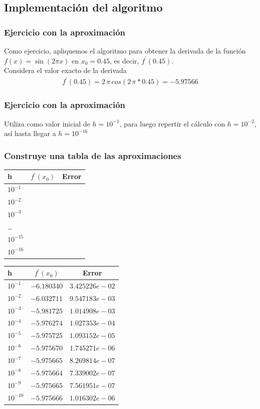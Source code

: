 \subsection{Implementación del algoritmo}
\begin{frame}
\frametitle{Ejercicio con la aproximación}
Como ejercicio, apliquemos el algoritmo para obtener la derivada de la función $f(x) = \sin(2 \pi x)$ en $x_{0}=0.45$, es decir,  $f^{\prime}(0.45)$.
\\
\bigskip
\pause
Considera el valor exacto de la derivada 
\begin{align*}
f^{\prime}(0.45) = 2 \, \pi \, cos(2 \, \pi * 0.45) = -5.97566
\end{align*}
\end{frame}
\begin{frame}
\frametitle{Ejercicio con la aproximación}
Utiliza como valor inicial de $h = 10^{-1}$, para luego repertir el cálculo con $h = 10^{-2}$, así hasta llegar a $h = 10^{-16}$
\end{frame}
\begin{frame}
\frametitle{Construye una tabla de las aproximaciones}
\begin{center}
\begin{tabular}{l | l | l}
h & $f^{\prime}(x_{0})$ & Error \\ \hline
$10^{-1}$ & & \\ \hline
$10^{-2}$ & & \\ \hline
$10^{-3}$ & & \\ \hline
\ldots & & \\ \hline
$10^{-15}$ & & \\ \hline
$10^{-16}$ & & \\ \hline
\end{tabular}
\end{center}
\end{frame}
\begin{frame}[fragile]
\begin{table}
\fontsize{12}{12}\selectfont
\centering
\begin{tabular}{l | p{2cm} | p{3cm}}
h & \multicolumn{1}{c}{$f^{\prime}(x_{0})$ } & \multicolumn{1}{c}{Error} \\ \hline
$10^{-1}$ & $-6.180340$ & $3.425226e-02$ \\ \hline
$10^{-2}$ & $-6.032711$ & $9.547183e-03$ \\ \hline
$10^{-3}$ & $-5.981725$ & $1.014908e-03$ \\ \hline
$10^{-4}$ & $-5.976274$ & $1.027353e-04$ \\ \hline
$10^{-5}$ & $-5.975725$ & $1.093152e-05$ \\ \hline
$10^{-6}$ & $-5.975670$ & $1.745271e-06$ \\ \hline
$10^{-7}$ & $-5.975665$ & $8.269814e-07$ \\ \hline
$10^{-8}$ & $-5.975664$ & $7.339002e-07$ \\ \hline
$10^{-9}$ & $-5.975665$ & $7.561951e-07$ \\ \hline
$10^{-10}$ & $-5.975666$ & $1.016302e-06$ \\ \hline
\end{tabular}
\end{table}
\end{frame}
